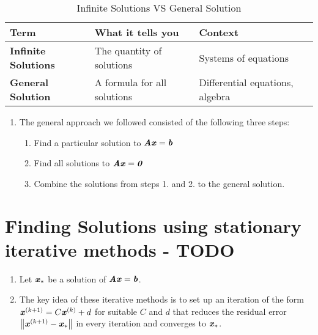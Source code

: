 \begin{customArrayStretch}{1.3}
\begin{table}[H]
    \centering
    \begin{tabular}{|l|l|l|}
        \hline
        \textbf{Term} & 
            \textbf{What it tells you} & 
            \textbf{Context} \\ \hline

        \textbf{Infinite Solutions} & 
            The quantity of solutions & 
            Systems of equations \\ \hline

        \textbf{General Solution} & 
            A formula for all solutions & 
            Differential equations, algebra \\ \hline

    \end{tabular}
    \caption*{Infinite Solutions VS General Solution \cite{common/online/chatgpt}}
\end{table}
\end{customArrayStretch}


\begin{enumerate}
    \item The general approach we followed consisted of the following three steps:
    \begin{enumerate}
        \item Find a particular solution to $\text{\textbf{\textit{Ax}}} = \text{\textbf{\textit{b}}}$
        \hfill \cite{mfml/book/mml/Deisenroth-Faisal-Ong}

        \item Find all solutions to $\text{\textbf{\textit{Ax}}} = \text{\textbf{\textit{0}}}$
        \hfill \cite{mfml/book/mml/Deisenroth-Faisal-Ong}

        \item Combine the solutions from steps 1. and 2. to the general solution.
        \hfill \cite{mfml/book/mml/Deisenroth-Faisal-Ong}
    \end{enumerate}

    
\end{enumerate}



\section{Finding Solutions using stationary iterative methods - TODO}

\begin{enumerate}
    \item Let $\text{\textbf{\textit{x}}}_\ast$ be a solution of $\text{\textbf{\textit{Ax}}} = \text{\textbf{\textit{b}}}$.
    \hfill \cite{mfml/book/mml/Deisenroth-Faisal-Ong}
    
    \item The key idea of these iterative methods is to set up an iteration of the form
    $
        \text{\textbf{\textit{x}}}^{(k+1)} = C\text{\textbf{\textit{x}}}^{(k)} + d
    $
    for suitable $C$ and $d$ that reduces the residual error $\left\| \text{\textbf{\textit{x}}}^{(k+1)} - \text{\textbf{\textit{x}}}_\ast \right\|$ in every iteration and converges to $\text{\textbf{\textit{x}}}_\ast$.
    \hfill \cite{mfml/book/mml/Deisenroth-Faisal-Ong}

\end{enumerate}


